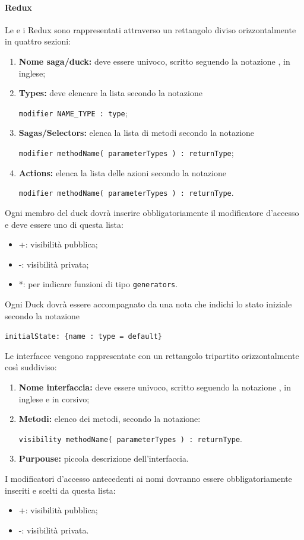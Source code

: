 \documentclass[NormeDiProgetto.tex]{subfiles}
\begin{document}
\paragraph{Redux}
Le  e i  Redux sono rappresentati attraverso un rettangolo diviso orizzontalmente in quattro sezioni:
\begin{enumerate}
	\item \textbf{Nome saga/duck:} deve essere univoco, scritto seguendo la notazione , in inglese;
	\item \textbf{Types:} deve elencare la lista secondo la notazione 
	\begin{center}
		\texttt{modifier NAME\_TYPE : type};
	\end{center}
	\item \textbf{Sagas/Selectors:} elenca la lista di metodi secondo la notazione 
	\begin{center}
		\texttt{modifier methodName( parameterTypes ) : returnType};
	\end{center}
	\item \textbf{Actions:} elenca la lista delle azioni secondo la notazione 
	\begin{center}
		\texttt{modifier methodName( parameterTypes ) : returnType}.
	\end{center}
\end{enumerate}
Ogni membro del duck dovrà inserire obbligatoriamente il modificatore d'accesso e deve essere uno di questa lista:
\begin{itemize}
	\item +: visibilità pubblica;
	\item -: visibilità privata;
	\item *: per indicare funzioni di tipo \texttt{generators}.
\end{itemize}
Ogni Duck dovrà essere accompagnato da una nota che indichi lo stato iniziale secondo la notazione
\begin{center}
	\texttt{initialState: \{name : type = default\}}
\end{center}
Le interfacce vengono rappresentate con un rettangolo tripartito orizzontalmente così suddiviso:
\begin{enumerate}
	\item \textbf{Nome interfaccia:} deve essere univoco, scritto seguendo la notazione , in inglese e in corsivo;
	\item \textbf{Metodi:} elenco dei metodi, secondo la notazione:
	\begin{center}
		\texttt{visibility methodName( parameterTypes ) : returnType}.
	\end{center}
	\item \textbf{Purpouse:} piccola descrizione dell'interfaccia.
\end{enumerate}
I modificatori d'accesso antecedenti ai nomi dovranno essere obbligatoriamente inseriti e scelti da questa lista:
\begin{itemize}
	\item +: visibilità pubblica;
	\item -: visibilità privata.
\end{itemize}
\end{document}
